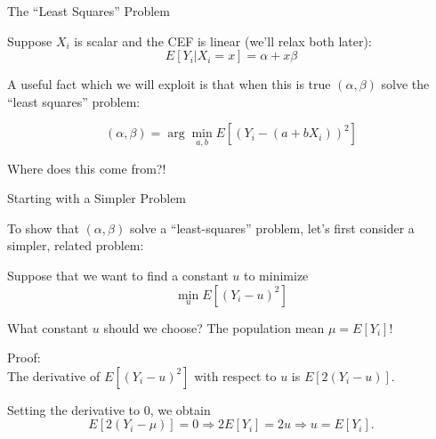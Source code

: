 \documentclass[11pt,english,handout]{beamer}
\newenvironment{wideitemize}{\itemize\addtolength{\itemsep}{10pt}}{\enditemize}
\begin{document}
\begin{frame}{The ``Least Squares'' Problem}

\begin{wideitemize}

\item
Suppose $X_i$ is scalar and the CEF is linear (we'll relax both later):
$$E[Y_i | X_i = x] = \alpha + x \beta$$

\pause
\item
A useful fact which we will exploit is that when this is true $(\alpha,\beta)$ solve the ``least squares'' problem:

$$(\alpha,\beta)=\arg\min_{a,b} E[ (Y_i - (a + b X_i))^2  ] $$


\pause
\item
Where does this come from?!


\end{wideitemize}
	
\end{frame}

\begin{frame}{Starting with a Simpler Problem}
\begin{wideitemize}
	\item
	To show that $(\alpha,\beta)$ solve a ``least-squares'' problem, let's first consider a simpler, related problem:
	
	\pause
	\item
	Suppose that we want to find a constant $u$ to minimize 
	$$\min_u E[ (Y_i - u)^2 ]$$
	
	\pause
	\item
	What constant $u$ should we choose? \pause The population mean $\mu=E[Y_i]$!
	
	\pause
	\item
	Proof: \\
	
	The derivative of $E[ (Y_i - u)^2 ]$ with respect to $u$ is $E[ 2(Y_i - u) ]$.  \\ \pause
	
	
	Setting the derivative to 0, we obtain
	$$E[ 2(Y_i - \mu) ] = 0 \Rightarrow 2 E[Y_i] = 2 u \Rightarrow u = E[Y_i].$$
	
\end{wideitemize}	
\end{frame}
\end{document}
